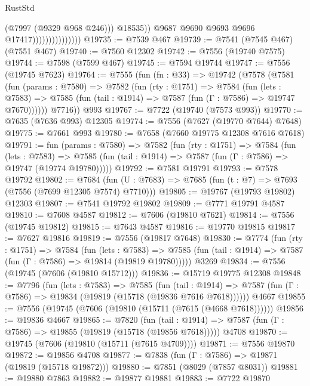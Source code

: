 \begin{lexlean}{RustStd}
\begin{coremodule}
{\begin{coremodule}
{{{{{{{{{{{{{{{{{{{{{{{{{{{{{{{{{{{{{{{{{{{                                        (@7997 (@9329 @968 @246)))
                                      @18535))
                                  @9687
                                  @9690
                                  @9693
                                  @9696
                                  @17417)))))))))))))))
@19735 := @7539 @467
@19739 := @7541 (@7545 @467) (@7551 @467)
@19740 := @7560 @12302
@19742 := @7556 (@19740 @7575)
@19744 := @7598 (@7599 @467)
@19745 := @7594 @19744
@19747 := @7556 (@19745 @7623)
@19764 := @7555
    (fun (fn : @33) =>
    @19742
      (@7578
        (@7581
          (fun (params : @7580) =>
          @7582
            (fun (rty : @1751) =>
            @7584
              (fun (lets : @7583) =>
              @7585 (fun (tail : @1914) => @7587 (fun (Γ : @7586) => @19747 @7670))))))
        @7716))
    @993
@19767 := @7722 (@19740 (@7573 @993))
@19770 := @7635 (@7636 @993) @12305
@19774 := @7556 (@7627 (@19770 @7644) @7648)
@19775 := @7661 @993
@19780 := @7658 (@7660 @19775 @12308 @7616 @7618)
@19791 := fun (params : @7580) =>
  @7582
    (fun (rty : @1751) =>
    @7584
      (fun (lets : @7583) =>
      @7585 (fun (tail : @1914) => @7587 (fun (Γ : @7586) => @19747 (@19774 @19780)))))
@19792 := @7581 @19791
@19793 := @7578 @19792
@19802 := @7684
    (fun (U : @7683) => @7685 (fun (t : @7) => @7693 (@7556 (@7699 @12305 @7574) @7710)))
@19805 := @19767 (@19793 @19802) @12303
@19807 := @7541 @19792 @19802
@19809 := @7771 @19791 @4587
@19810 := @7608 @4587
@19812 := @7606 (@19810 @7621)
@19814 := @7556 (@19745 @19812)
@19815 := @7643 @4587
@19816 := @19770 @19815
@19817 := @7627 @19816
@19819 := @7556 (@19817 @7648)
@19830 := @7774
    (fun (rty : @1751) =>
    @7584
      (fun (lets : @7583) =>
      @7585 (fun (tail : @1914) => @7587 (fun (Γ : @7586) => @19814 (@19819 @19780)))))
    @3269
@19834 := @7556 (@19745 (@7606 (@19810 @15712)))
@19836 := @15719 @19775 @12308
@19848 := @7796
    (fun (lets : @7583) =>
    @7585
      (fun (tail : @1914) =>
      @7587 (fun (Γ : @7586) => @19834 (@19819 (@15718 (@19836 @7616 @7618))))))
    @4667
@19855 := @7556 (@19745 (@7606 (@19810 (@15711 (@7615 (@4668 @7618))))))
@19856 := @19836 @4667
@19865 := @7820
    (fun (tail : @1914) => @7587 (fun (Γ : @7586) => @19855 (@19819 (@15718 (@19856 @7618)))))
    @4708
@19870 := @19745 (@7606 (@19810 (@15711 (@7615 @4709))))
@19871 := @7556 @19870
@19872 := @19856 @4708
@19877 := @7838 (fun (Γ : @7586) => @19871 (@19819 (@15718 @19872)))
@19880 := @7851 (@8029 (@7857 @8031))
@19881 := @19880 @7863
@19882 := @19877 @19881
@19883 := @7722 @19870
}}}}}}}}}}}}}}}}}}}}}}}}}}}}}}}}}}}}}}}}}}}
\end{coremodule}}
\end{coremodule}
\end{lexlean}
